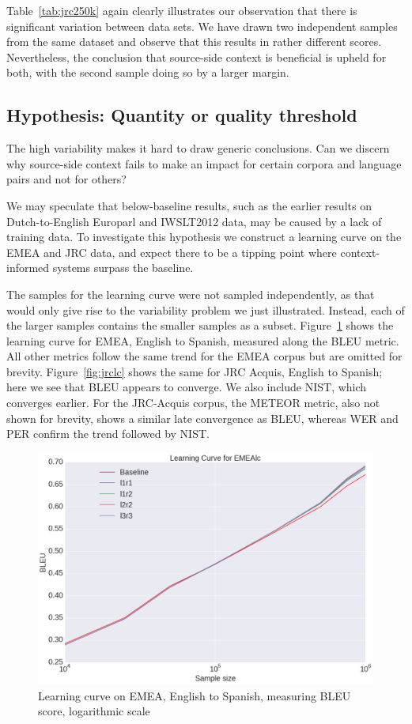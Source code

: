 \documentclass[smallextended]{svjour3}       %
\theoremstyle{break}
\begin{document}
Table~\ref{tab:jrc250k} again clearly illustrates our observation that there is
significant variation between data sets. We have drawn two independent samples
from the same dataset and observe that this results in rather different scores.
Nevertheless, the conclusion that source-side context is beneficial is upheld
for both, with the second sample doing so by a larger margin. 

\subsection{Hypothesis: Quantity or quality threshold}
\label{sec:qqthreshold}

The high variability makes it hard to draw generic conclusions. Can we discern
why source-side context fails to make an impact for certain corpora and
language pairs and not for others?

We may speculate that below-baseline results, such as the earlier results on Dutch-to-English
Europarl and IWSLT2012 data, may be caused by a lack of training data. To
investigate this hypothesis we construct a learning curve on the EMEA and JRC
data, and expect there to be a tipping point where context-informed systems
surpass the baseline.

The samples for the learning curve were not sampled independently, as that
would only give rise to the variability problem we just illustrated.  Instead,
each of the larger samples contains the smaller samples as a subset.
Figure~\ref{fig:emealc} shows the learning curve for EMEA, English to Spanish,
measured along the BLEU metric. All other metrics follow the same trend for the
EMEA corpus but are omitted for brevity. Figure~\ref{fig:jrclc} shows the same for JRC Acquis, English to
Spanish; here we see that BLEU appears to converge. We also include
NIST, which converges earlier. For the JRC-Acquis corpus, the METEOR metric,
also not shown for brevity, shows a similar late convergence as BLEU, whereas WER and PER confirm
the trend followed by NIST.

\begin{figure}
\includegraphics[width=120.00mm]{emealcbleu.png}
\caption{Learning curve on EMEA, English to Spanish, measuring BLEU score, logarithmic scale}
\label{fig:emealc}
\end{figure}
\end{document}
